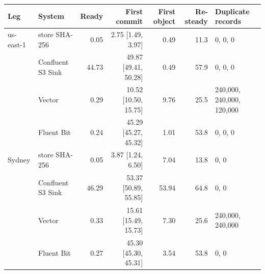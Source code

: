
\begin{tabular}{@{}llrrrrl@{}}
\toprule
Leg & System & Ready & First commit & First object & Re-steady & Duplicate records \\
\midrule
us-east-1 & \sysname{} store SHA-256 & 0.05 & 2.75 [1.49, 3.97] & 0.49 & 11.3 & 0, 0, 0 \\
 & Confluent S3 Sink & 44.73 & 49.87 [49.41, 50.28] & 0.49 & 57.9 & 0, 0, 0 \\
 & Vector & 0.29 & 10.52 [10.50, 15.75] & 9.76 & 25.5 & 240{,}000, 240{,}000, 120{,}000 \\
 & Fluent Bit & 0.24 & 45.29 [45.27, 45.32] & 1.01 & 53.8 & 0, 0, 0 \\
\addlinespace[1pt]
Sydney & \sysname{} store SHA-256 & 0.05 & 3.87 [1.24, 6.50] & 7.04 & 13.8 & 0, 0 \\
 & Confluent S3 Sink & 46.29 & 53.37 [50.89, 55.85] & 53.94 & 64.8 & 0, 0 \\
 & Vector & 0.33 & 15.61 [15.49, 15.73] & 7.30 & 25.6 & 240{,}000, 240{,}000 \\
 & Fluent Bit & 0.27 & 45.30 [45.30, 45.31] & 3.54 & 53.8 & 0, 0 \\
\bottomrule
\end{tabular}
